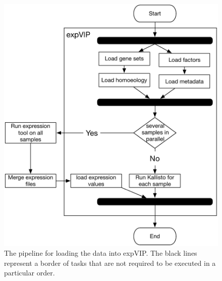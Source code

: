 \begin{figure}
\centering
\includegraphics[width=1\textwidth]{expVIP/Figures/loadDataPipeline.pdf}
\caption[expVIP load data]{The pipeline for loading the data into expVIP. The black lines represent a border of tasks that are not required to be executed in a particular order.}
\label{fig:exp:loadPipeline}
\end{figure}

